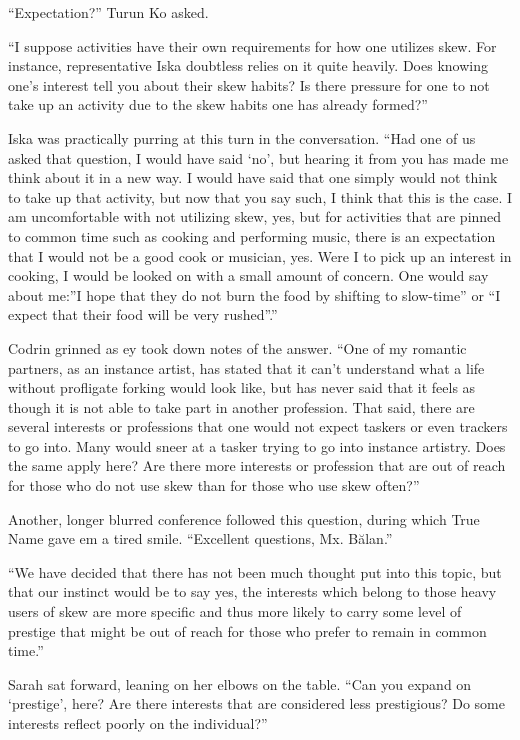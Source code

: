``Expectation?'' Turun Ko asked.

``I suppose activities have their own requirements for how one utilizes skew. For instance, representative Iska doubtless relies on it quite heavily. Does knowing one's interest tell you about their skew habits? Is there pressure for one to not take up an activity due to the skew habits one has already formed?''

Iska was practically purring at this turn in the conversation. ``Had one of us asked that question, I would have said `no', but hearing it from you has made me think about it in a new way. I would have said that one simply would not think to take up that activity, but now that you say such, I think that this is the case. I am uncomfortable with not utilizing skew, yes, but for activities that are pinned to common time such as cooking and performing music, there is an expectation that I would not be a good cook or musician, yes. Were I to pick up an interest in cooking, I would be looked on with a small amount of concern. One would say about me:''I hope that they do not burn the food by shifting to slow-time'' or ``I expect that their food will be very rushed''.''

Codrin grinned as ey took down notes of the answer. ``One of my romantic partners, as an instance artist, has stated that it can't understand what a life without profligate forking would look like, but has never said that it feels as though it is not able to take part in another profession. That said, there are several interests or professions that one would not expect taskers or even trackers to go into. Many would sneer at a tasker trying to go into instance artistry. Does the same apply here? Are there more interests or profession that are out of reach for those who do not use skew than for those who use skew often?''

Another, longer blurred conference followed this question, during which True Name gave em a tired smile. ``Excellent questions, Mx. Bălan.''

``We have decided that there has not been much thought put into this topic, but that our instinct would be to say yes, the interests which belong to those heavy users of skew are more specific and thus more likely to carry some level of prestige that might be out of reach for those who prefer to remain in common time.''

Sarah sat forward, leaning on her elbows on the table. ``Can you expand on `prestige', here? Are there interests that are considered less prestigious? Do some interests reflect poorly on the individual?''


